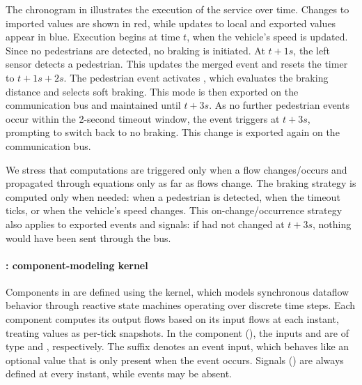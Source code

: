 The chronogram in  illustrates the execution of the \aeb
service over time. Changes to imported values are shown in red, while updates to local and exported
values appear in blue. Execution begins at time $t$, when the vehicle's speed is updated. Since no
pedestrians are detected, no braking is initiated. At $t + 1s$, the left sensor detects a
pedestrian. This updates the merged  event and resets the  timer to
$t + 1s + 2s$. The pedestrian event activates , which evaluates the braking
distance and selects soft braking. This mode is then exported on the communication bus and
maintained until $t + 3s$. As no further pedestrian events occur within the 2-second timeout window,
the  event triggers at $t + 3s$, prompting  to switch back to no
braking. This change is exported again on the communication bus.

We stress that computations are triggered only when a flow changes/occurs and propagated through
equations only as far as flows change. The braking strategy is computed only when needed: when a
pedestrian is detected, when the timeout ticks, or when the vehicle's speed changes. This
on-change/occurrence strategy also applies to exported events and signals: if  had not
changed at $t + 3s$, nothing would have been sent through the bus.

\paragraph{\GRSync: component-modeling kernel}
%
Components in \GRust are defined using the \GRSync kernel, which models synchronous dataflow
behavior through reactive state machines operating over discrete time steps. Each component computes
its output flows based on its input flows at each instant, treating values as per-tick snapshots.
%
In the  component (), the
inputs  and  are of type  and , respectively. The 
suffix denotes an event input, which behaves like an optional value that is only present when the
event occurs. Signals (\eg {}) are always defined at every instant, while events may be absent.


